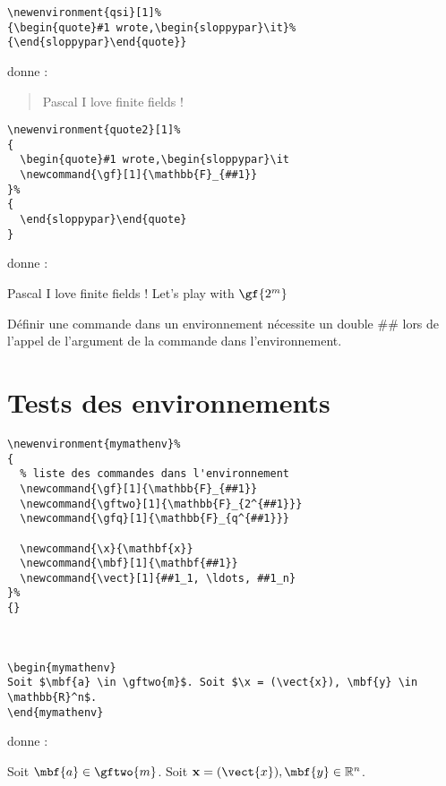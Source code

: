\bigskip
\begin{verbatim}
\newenvironment{qsi}[1]%
{\begin{quote}#1 wrote,\begin{sloppypar}\it}%
{\end{sloppypar}\end{quote}}
\end{verbatim}
donne :\\
\begin{quote}{Pascal}
I love finite fields !
\end{quote}




\begin{verbatim}
\newenvironment{quote2}[1]%
{
  \begin{quote}#1 wrote,\begin{sloppypar}\it
  \newcommand{\gf}[1]{\mathbb{F}_{##1}}
}%
{
  \end{sloppypar}\end{quote}
}
\end{verbatim}
donne :\\
\begin{quote2}{Pascal}
I love finite fields ! Let's play with $\gf{2^m}$
\end{quote2}


Définir une commande dans un environnement nécessite un double \#\# lors de l'appel de l'argument de la commande dans l'environnement.

\section{Tests des environnements}

\begin{verbatim}
\newenvironment{mymathenv}%
{
  % liste des commandes dans l'environnement
  \newcommand{\gf}[1]{\mathbb{F}_{##1}}
  \newcommand{\gftwo}[1]{\mathbb{F}_{2^{##1}}}
  \newcommand{\gfq}[1]{\mathbb{F}_{q^{##1}}}

  \newcommand{\x}{\mathbf{x}}
  \newcommand{\mbf}[1]{\mathbf{##1}}
  \newcommand{\vect}[1]{##1_1, \ldots, ##1_n}
}%
{}



\begin{mymathenv}
Soit $\mbf{a} \in \gftwo{m}$. Soit $\x = (\vect{x}), \mbf{y} \in \mathbb{R}^n$.
\end{mymathenv}
\end{verbatim}
donne :\\
\begin{mymathenv}
Soit $\mbf{a} \in \gftwo{m}$. Soit $\x = (\vect{x}), \mbf{y} \in \mathbb{R}^n$.
\end{mymathenv}